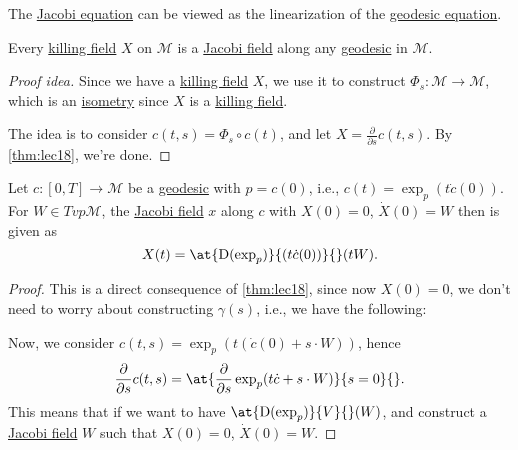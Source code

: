 \begin{intuition}
	The \hyperref[eq:Jacobi]{Jacobi equation} can be viewed as the linearization of the \hyperref[eq:geodesic]{geodesic equation}.
\end{intuition}

\begin{corollary}
	Every \hyperref[def:killing-field]{killing field} \(X\) on \(\mathcal{M} \) is a \hyperref[def:Jacobi-field]{Jacobi field} along any \hyperref[def:geodesic]{geodesic} in \(\mathcal{M} \).
\end{corollary}
\begin{proof}[Proof idea]
	Since we have a \hyperref[def:killing-field]{killing field} \(X\), we use it to construct \(\Phi _s \colon \mathcal{M} \to \mathcal{M} \), which is an \hyperref[def:isometry]{isometry} since \(X\) is a \hyperref[def:killing-field]{killing field}.
	\begin{center}
	\end{center}
	The idea is to consider \(c(t, s) = \Phi _s \circ c(t)\), and let \(X = \frac{\partial }{\partial s} c(t, s)\). By \autoref{thm:lec18}, we're done.
\end{proof}

\begin{corollary}
	Let \(c\colon [0, T] \to \mathcal{M} \) be a \hyperref[def:geodesic]{geodesic} with \(p = c(0)\), i.e., \(c(t) = \exp _p (t \dot{c} (0))\). For \(W\in Tvp \mathcal{M} \), the \hyperref[def:Jacobi-field]{Jacobi field} \(x\) along \(c\) with \(X(0) = 0\), \(\dot{X} ( 0) = W\) then is given as
	\[
		X(t) = \at{\mathrm{D} (\exp _p)}{(t \dot{c} (0))}{} (tW).
	\]
\end{corollary}
\begin{proof}
	This is a direct consequence of \autoref{thm:lec18}, since now \(X(0) = 0\), we don't need to worry about constructing \(\gamma (s)\), i.e., we have the following:
	\begin{center}
	\end{center}
	Now, we consider \(c(t, s) = \exp _p (t(\dot{c} (0) + s\cdot W))\), hence
	\[
		\frac{\partial }{\partial s} c(t, s) = \at{\frac{\partial }{\partial s} \exp _p(t \dot{c} + s\cdot W)}{s = 0}{} .
	\]
	This means that if we want to have \(\at{\mathrm{D} (\exp _p)}{V}{} (W)\), and construct a \hyperref[def:Jacobi-field]{Jacobi field} \(W\) such that \(X(0)=0\), \(\dot{X} (0) = W\).
\end{proof}

